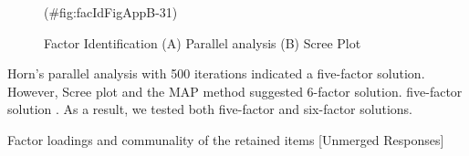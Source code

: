 \begin{appendix}
\begin{figure}
{}

\caption{Factor Identification (A) Parallel analysis (B) Scree Plot}(\#fig:facIdFigAppB-31)
\end{figure}

Horn's parallel analysis with 500 iterations indicated a five-factor
solution. However, Scree plot and the MAP method suggested 6-factor
solution. five-factor solution . As a result, we tested both five-factor
and six-factor solutions.

\begin{table}[h]

\begin{center}
\begin{threeparttable}

\caption{\label{tab:EFATableAppB-34}Factor loadings and communality of the retained items [Unmerged Responses]}

\small{

}
\end{threeparttable}
\end{center}
\end{table}
\end{appendix}
